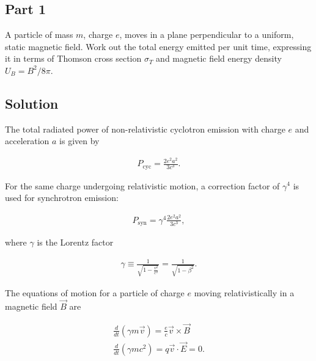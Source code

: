 \documentclass[12pt]{article}
\begin{document}

\subsection*{Part 1}

A particle of mass $m$, charge $e$, moves in a plane perpendicular to a uniform, static magnetic field. Work out the total energy emitted per unit time, expressing it in terms of Thomson cross section $\sigma_T$ and magnetic field energy density $U_B = B^2/8\pi$.


\subsection*{Solution}

The total radiated power of non-relativistic cyclotron emission with charge $e$ and acceleration $a$ is given by

\begin{align*}
    P_\mathrm{cyc} = \frac{2e^2a^2}{3c^3}.
\end{align*}

{\noindent}For the same charge undergoing relativistic motion, a correction factor of $\gamma^4$ is used for synchrotron emission:

\begin{align*}
    P_\mathrm{syn} = \gamma^4 \frac{2e^2a^2}{3c^3},
\end{align*}

{\noindent}where $\gamma$ is the Lorentz factor 

\begin{align*}
    \gamma \equiv \frac{1}{\sqrt{1 - \frac{v^2}{c^2}}} = \frac{1}{\sqrt{1 - \beta^2}}.
\end{align*}

The equations of motion for a particle of charge $e$ moving relativistically in a magnetic field $\vec{B}$ are

\begin{align*}
    \frac{d}{dt}(\gamma m\vec{v}) = \frac{e}{c} \vec{v} \times \vec{B} \\
    \frac{d}{dt}(\gamma mc^2) = q\vec{v}\cdot\vec{E} = 0.
\end{align*}
\end{document}

